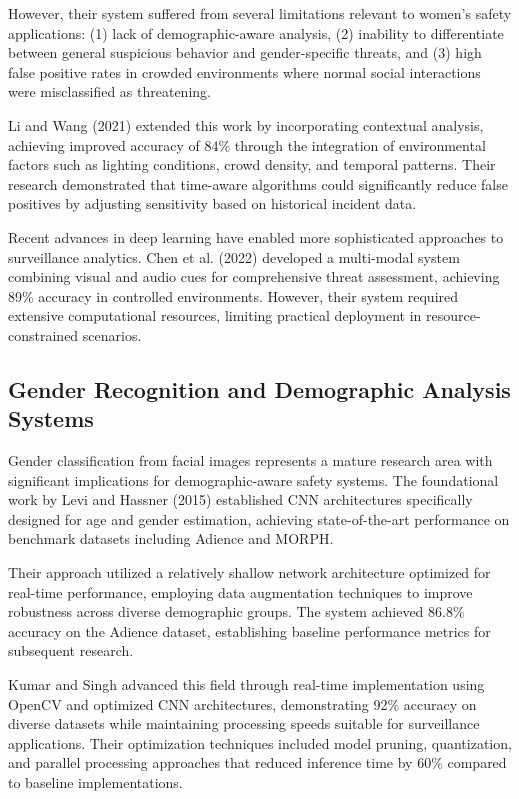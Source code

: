 \documentclass[12pt,a4paper]{article}
\begin{document}
However, their system suffered from several limitations relevant to women's safety applications: (1) lack of demographic-aware analysis, (2) inability to differentiate between general suspicious behavior and gender-specific threats, and (3) high false positive rates in crowded environments where normal social interactions were misclassified as threatening.

Li and Wang (2021) extended this work by incorporating contextual analysis, achieving improved accuracy of 84\% through the integration of environmental factors such as lighting conditions, crowd density, and temporal patterns. Their research demonstrated that time-aware algorithms could significantly reduce false positives by adjusting sensitivity based on historical incident data.

Recent advances in deep learning have enabled more sophisticated approaches to surveillance analytics. Chen et al. (2022) developed a multi-modal system combining visual and audio cues for comprehensive threat assessment, achieving 89\% accuracy in controlled environments. However, their system required extensive computational resources, limiting practical deployment in resource-constrained scenarios.

\subsection{Gender Recognition and Demographic Analysis Systems}

Gender classification from facial images represents a mature research area with significant implications for demographic-aware safety systems. The foundational work by Levi and Hassner (2015) established CNN architectures specifically designed for age and gender estimation, achieving state-of-the-art performance on benchmark datasets including Adience and MORPH.

Their approach utilized a relatively shallow network architecture optimized for real-time performance, employing data augmentation techniques to improve robustness across diverse demographic groups. The system achieved 86.8\% accuracy on the Adience dataset, establishing baseline performance metrics for subsequent research.

Kumar and Singh \cite{Kumar2020} advanced this field through real-time implementation using OpenCV and optimized CNN architectures, demonstrating 92\% accuracy on diverse datasets while maintaining processing speeds suitable for surveillance applications. Their optimization techniques included model pruning, quantization, and parallel processing approaches that reduced inference time by 60\% compared to baseline implementations.
\end{document}
